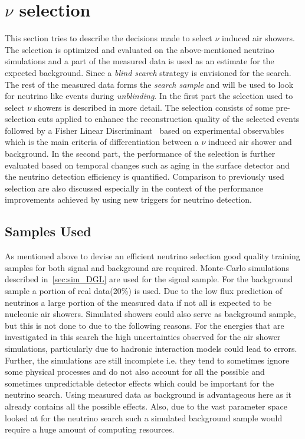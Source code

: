 \section{$\nu$ selection}
\label{sec:nu_sel}
This section tries to describe the decisions made to select $\nu$ induced air showers. The selection is optimized and evaluated on the above-mentioned neutrino simulations and a part of the measured data is used as an estimate for the expected background. Since a \textit{blind search} strategy is envisioned for the search. The rest of the measured data forms the \textit{search sample} and will be used to look for neutrino like events during \textit{unblinding}. 
In the first part the selection used to select $\nu$ showers is described in more detail. The selection consists of some pre-selection cuts applied to enhance the reconstruction quality of the selected events followed by a Fisher Linear Discriminant~\cite{} based on experimental observables which is the main criteria of differentiation between a $\nu$ induced air shower and background.  
In the second part, the performance of the selection is further evaluated based on temporal changes such as aging in the surface detector and the neutrino detection efficiency is quantified. Comparison to previously used selection are also discussed especially in the context of the performance improvements achieved by using new triggers for neutrino detection.

\subsection{Samples Used}
\label{subsec:nu_sel_samp}

As mentioned above to devise an efficient neutrino selection good quality training samples for both signal and background are required. Monte-Carlo simulations described in~\ref{sec:sim_DGL} are used for the signal sample. For the background sample a portion of real data(20\%) is used. Due to the low flux prediction of neutrinos a large portion of the measured data if not all is expected to be nucleonic air showers. Simulated showers could also serve as background sample, but this is not done to due to the following reasons. For the energies that are investigated in this search the high uncertainties observed for the air shower simulations, particularly due to hadronic interaction models could lead to errors. Further, the simulations are still incomplete i.e. they tend to sometimes ignore some physical processes and do not also account for all the possible and sometimes unpredictable detector effects which could be important for the neutrino search. Using measured data as background is advantageous here as it already contains all the possible effects. Also, due to the vast parameter space looked at for the neutrino search such a simulated background sample would require a huge amount of computing resources. 


